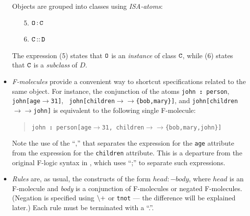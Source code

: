\documentclass[11pt]{article}
\newcommand{\isa}{\,{\bf{:}}\,}
\newcommand{\subcl}{\,{\bf{::}}\,}
\newcommand{\fd}{\ensuremath{{\rightarrow}}}                   %
\newcommand{\mvd}{\ensuremath{{\rightarrow\!\!\!\!\rightarrow}}}  %
\newcommand{\fl}{\mbox{F-logic}\xspace}
\newcommand{\NAF}{{$\tt\backslash +$}\xspace}
\begin{document}
\begin{itemize}
  \medskip

  Objects are grouped into classes using \emph{ISA-atoms}:
  \medskip

  \begin{enumerate}
  \item[5.] $\tt O\isa C$
  \item[6.] \label{eq-subclass} $\tt C\subcl D$
  \end{enumerate}

  The expression (5) states that $\tt O$ is an \emph{instance} of class $\tt C$,
  while (6) states that $\tt C$ is a \emph{subclass} of $D$.
\item
  \emph{F-molecules} provide a convenient way to shortcut specifications
  related to the same object. For instance, the conjunction of the atoms
  {\tt john{\isa}person}, {\tt john[age{\fd}31]}, {\tt
  john[children\mvd\{bob,mary\}]}, and {\tt john[children\mvd john]}
  is equivalent to the following single F-molecule:
  \begin{quote}
    {\tt john{\isa}person[age{\fd}31, children\mvd\{bob,mary,john\}]} 
  \end{quote}
  Note the use of the ``,'' that separates the expression for the {\tt age}
  attribute from the expression for the {\tt children} attribute. This is a
  departure from the original \fl syntax in \cite{KLW95}, which uses ``;'' 
  to separate such expressions.
  
\item \emph{Rules} are, as usual, the constructs of the form $head :-
  body$, where $head$ is an F-molecule and \emph{body} is a conjunction of
  F-molecules or negated F-molecules. (Negation is specified using {\NAF}
    or {\tt tnot} --- the difference will be explained later.)
  Each rule must be terminated with a ``.''.
  

\end{itemize}
\end{document}
